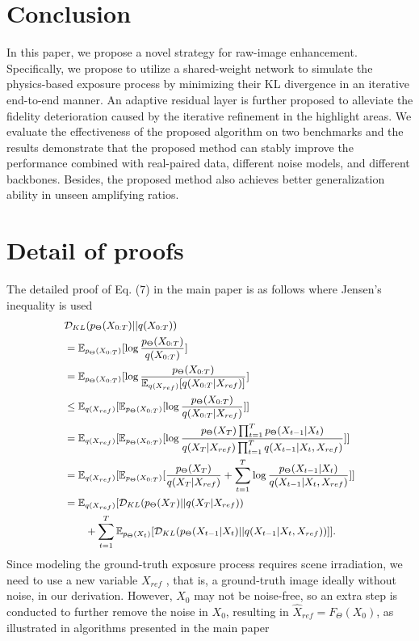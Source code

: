 \documentclass[10pt,twocolumn,letterpaper]{article}
\newcommand{\D}[2]{\mathcal{D}_{KL}(#1||#2)}
\newcommand{\E}[2]{\mathbb{E}_{#1}[#2]}
\def\p{p_\Theta}
\def\F{F_{\Theta}}
\begin{document}
\section{Conclusion}
\vspace{-0.1cm}
In this paper, we propose a novel strategy for raw-image enhancement. Specifically, we propose to utilize a shared-weight network to simulate the physics-based exposure process by minimizing their KL divergence in an iterative end-to-end manner. An adaptive residual layer is further proposed to alleviate the fidelity deterioration caused by the iterative refinement in the highlight areas. We evaluate the effectiveness of the proposed algorithm on two benchmarks and the results demonstrate that the proposed method can stably improve the performance combined with real-paired data, different noise models, and different backbones. Besides, the proposed method also achieves better generalization ability in unseen amplifying ratios.
 



{\small


}


\appendix

\section{Detail of proofs}
The detailed proof of Eq. (7) in the main paper is as follows where Jensen's inequality is used
\begin{equation*}
\small
\begin{aligned}
&\D{\p(X_{0:T})}{q(X_{0:T})} \\
    &= \E{\p(X_{0:T})}{\log \frac{\p(X_{0:T})}{q(X_{0:T})}} \\
    &= \E{\p(X_{0:T})}{\log \frac{\p(X_{0:T})}{\E{q(X_{ref})}{q(X_{0:T} | X_{ref})}}} \\
    & \leq \E{q(X_{ref})}{\E{\p(X_{0:T})}{\log \frac{\p(X_{0:T})}{q(X_{0:T}|X_{ref})}}} \\
    &= \E{q(X_{ref})}{\E{\p(X_{0:T})}{\log \frac{\p(X_T) \prod_{t=1}^T \p(X_{t-1}|X_{t})}{q(X_T|X_{ref}) \prod_{t=1}^T q(X_{t-1}|X_{t}, X_{ref})}}} \\
    & = \E{q(X_{ref})}{\E{\p(X_{0:T})}{\frac{\p(X_T)}{q(X_T|X_{ref})}+ \sum_{t=1}^{T} \log \frac{\p(X_{t-1}|X_{t})}{q(X_{t-1}|X_{t}, X_{ref})}}} \\
    &= \E{q(X_{ref})}{\D{\p(X_T)}{q(X_T|X_{ref})} \\ &\quad\quad + \sum_{t=1}^{T} \E{\p(X_t)}{\D{\p(X_{t-1}|X_{t})}{q(X_{t-1}|X_t,X_{ref})}}}.
\end{aligned}
\end{equation*}
Since modeling the ground-truth exposure process requires scene irradiation, we need to use a new variable $X_{ref}$ , that is, a ground-truth image ideally without noise, in our derivation. However, $X_0$ may not be noise-free, so an extra step is conducted to further remove the noise in $X_0$, resulting in $\hat{X}_{ref}=\F(X_0)$, as illustrated in algorithms presented in the main paper
\end{document}
